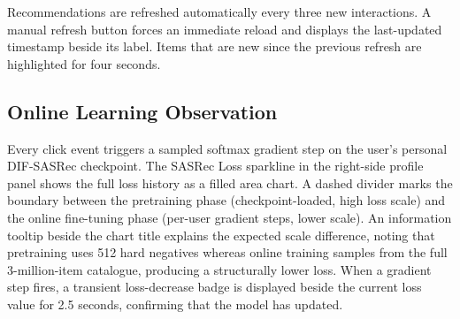 Recommendations are refreshed automatically every three new interactions.
A manual refresh button forces an immediate reload and displays the last-updated timestamp beside its label.
Items that are new since the previous refresh are highlighted for four seconds.

\subsection{Online Learning Observation}

Every click event triggers a sampled softmax gradient step on the user's personal DIF-SASRec checkpoint.
The SASRec Loss sparkline in the right-side profile panel shows the full loss history as a filled area chart.
A dashed divider marks the boundary between the pretraining phase (checkpoint-loaded, high loss scale) and the online fine-tuning phase (per-user gradient steps, lower scale).
An information tooltip beside the chart title explains the expected scale difference, noting that pretraining uses 512 hard negatives whereas online training samples from the full 3-million-item catalogue, producing a structurally lower loss.
When a gradient step fires, a transient loss-decrease badge is displayed beside the current loss value for 2.5 seconds, confirming that the model has updated.
